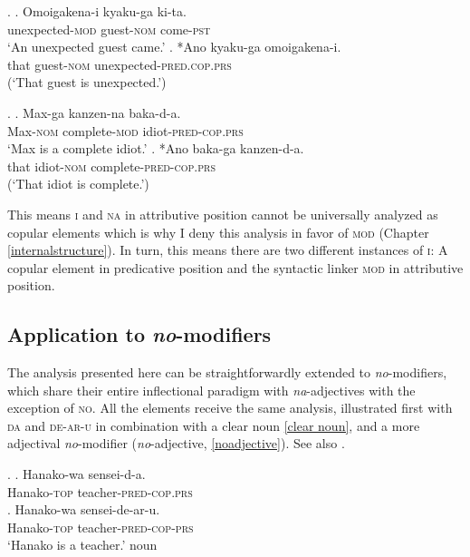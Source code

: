 \documentclass [output=book,colorlinks,citecolor=brown]{langscibook}
\begin{document}
\ex. \ag. Omoigakena-i kyaku-ga ki-ta.\\
unexpected-\textsc{mod} guest-\textsc{nom} come-\textsc{pst}\\
`An unexpected guest came.' \null \hfill \citep[67]{yamakido:2005:nature}
\bg. *Ano kyaku-ga omoigakena-i.\\
that guest-\textsc{nom} unexpected-\textsc{pred.cop.prs}\\
(`That guest is unexpected.’)

\ex. \ag. Max-ga kanzen-na baka-d-a.\\
Max-\textsc{nom} complete-\textsc{mod} idiot-\textsc{pred-cop.prs}\\
`Max is a complete idiot.' \null \hfill \citep[68]{yamakido:2005:nature}
\bg. *Ano baka-ga kanzen-d-a.\\
that idiot-\textsc{nom} complete-\textsc{pred-cop.prs}\\
(`That idiot is complete.’)

This means \textsc{i} and \textsc{na} in attributive position cannot be universally analyzed as copular elements which is why I deny this analysis in favor of \textsc{mod} (Chapter \ref{internalstructure}). In turn, this means there are two different instances of \textsc{i}: A copular element in predicative position and the syntactic linker \textsc{mod} in attributive position.

\subsection{Application to \textit{no}-modifiers}

The analysis presented here can be straightforwardly extended to \textit{no}-modifiers, which share their entire inflectional paradigm with \textit{na}-adjectives with the exception of \textsc{no}. All the elements receive the same analysis, illustrated first with \textsc{da} and \textsc{de-ar-u} in combination with a clear noun \ref{clear noun}, and a more adjectival \textit{no}-modifier (\textit{no}-adjective, \ref{noadjective}). See also \citet[195]{nishiyama:1999:adj}. %

\ex. \label{clear noun} \ag. Hanako-wa sensei-d-a.\\
Hanako-\textsc{top} teacher-\textsc{pred-cop.prs}\\
\bg. Hanako-wa sensei-de-ar-u.\\
Hanako-\textsc{top} teacher-\textsc{pred-cop-prs}\\
`Hanako is a teacher.' \null \hfill noun
\end{document}
